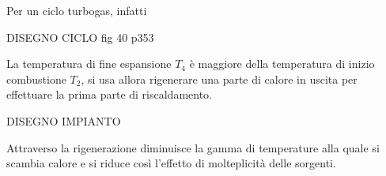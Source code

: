 \begin{adjustwidth}{2in}{}
	Per un ciclo turbogas, infatti 
	
	DISEGNO CICLO fig 40 p353
	
	La temperatura di fine espansione $T_4$ è maggiore della temperatura di inizio combustione $T_2$, si usa allora rigenerare una parte di calore in uscita per effettuare la prima parte di riscaldamento. 
	
	DISEGNO IMPIANTO
	
	Attraverso la rigenerazione diminuisce la gamma di temperature alla quale si scambia calore e si riduce così l'effetto di molteplicità delle sorgenti.
	
	
	
\end{adjustwidth}





